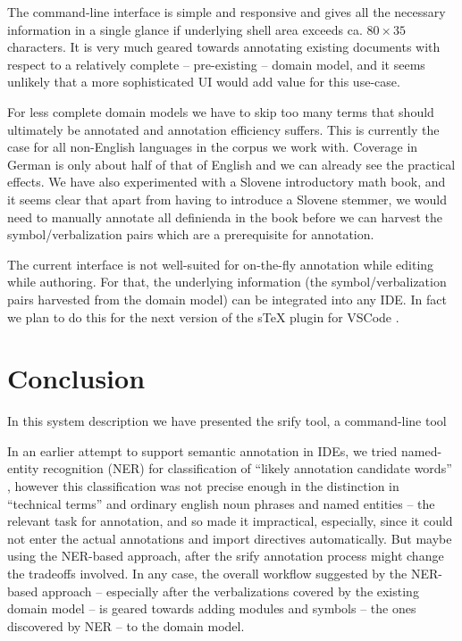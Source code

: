 \documentclass{llncs}
\newcommand\srf{\textsf{srify}\xspace}
\begin{document}
The command-line interface is simple and responsive and gives all the necessary
information in a single glance if underlying shell area exceeds ca. $80\times 35$
characters. It is very much geared towards annotating existing documents with respect to a
relatively complete -- pre-existing -- domain model, and it seems unlikely that a more
sophisticated UI would add value for this use-case.

For less complete domain models we have to skip too many terms that should ultimately be
annotated and annotation efficiency suffers. This is currently the case for all
non-English languages in the \sTeX corpus we work with. Coverage in German is only about
half of that of English and we can already see the practical effects. We have also
experimented with a Slovene introductory math book, and it seems clear that apart from
having to introduce a Slovene stemmer, we would need to manually annotate all
definienda in the book before we can harvest the symbol/verbalization pairs which are a
prerequisite for annotation.

The current interface is not well-suited for on-the-fly annotation while editing while
authoring. For that, the underlying information (the symbol/verbalization pairs harvested
from the domain model) can be integrated into any IDE. In fact we plan to do this for the
next version of the sTeX plugin for VSCode \cite{sTeX-IDE:git}.


\section{Conclusion}

In this system description we have presented the \srf tool, a command-line tool

In an earlier attempt to support semantic annotation in IDEs, we tried named-entity
recognition (NER) for classification of ``likely annotation candidate words''
\cite{hutterer:msc23}, however this classification was not precise enough in the
distinction in ``technical terms'' and ordinary english noun phrases and named entities --
the relevant task for annotation, and so made it impractical, especially, since it could
not enter the actual annotations and import directives automatically. But maybe using the
NER-based approach, after the \srf annotation process might change the tradeoffs
involved. In any case, the overall workflow suggested by the NER-based approach --
especially after the verbalizations covered by the existing domain model -- is geared towards adding modules and symbols -- the ones discovered by NER
-- to the domain model. 



\printbibliography
\end{document}
